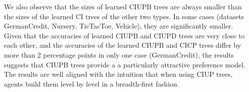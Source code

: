 We also observe that the sizes of learned CIUPB trees are always smaller 
than the sizes of the learned CI trees of the other two types. In some 
cases (datasets GermanCredit, Nursery, TicTacToe, Vehicle), they are significantly smaller. Given 
that the accuracies of learned CIUPB and CIUPD trees are very close to 
each other, and the accuracies of the learned CIUPB and CICP trees differ
by more than 2 percentage points in only one case (GermanCredit), the results suggests 
that CIUPB trees provide a a particularly attractive preference model.
The results are well aligned with the intuition that when using CIUP trees,
agents build them level by level in a breadth-first fashion.



